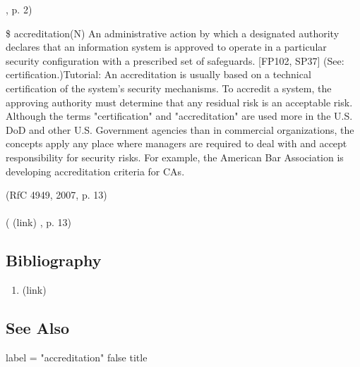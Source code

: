 \href{NIST SP 800-37, 2004 }{ } , p. 2)  \begin{DIC_BlockQuote} \$ accreditation(N) An administrative action by which a designated authority declares that an information system is approved to operate in a particular security configuration with a prescribed set of safeguards. {[}FP102, SP37{]} (See: certification.)Tutorial: An accreditation is usually based on a technical certification of the system's security mechanisms. To accredit a system, the approving authority must determine that any residual risk is an acceptable risk. Although the terms "certification" and "accreditation" are used more in the U.S. DoD and other U.S. Government agencies than in commercial organizations, the concepts apply any place where managers are required to deal with and accept responsibility for security risks. For example, the American Bar Association is developing accreditation criteria for CAs.  \end{DIC_BlockQuote} (RfC 4949, 2007, p. 13)  \paragraph{} (  (link) \href{RfC 4949, 2007 }{ } , p. 13)  \subsection*{Bibliography } \begin{enumerate} \item  (link) \href{RfC 4949, 2007 }{ } \end{enumerate} \subsection*{See Also } label = "accreditation"  false  title  